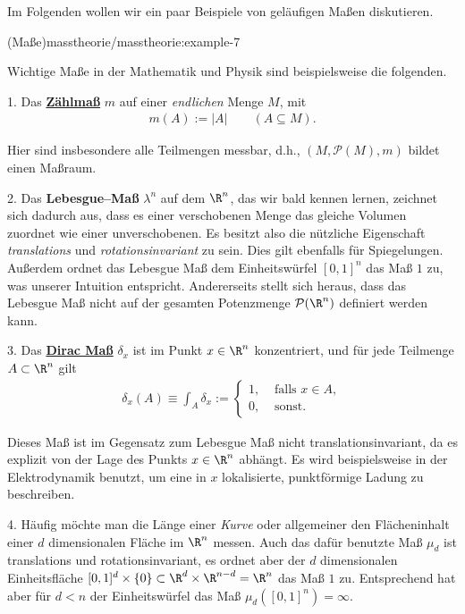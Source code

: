 \documentclass[letterpaper,10pt,german]{jupyterBook}
\begin{document}
\par
Im Folgenden wollen wir ein paar Beispiele von geläufigen Maßen diskutieren.
\begin{example}{(Maße)}{masstheorie/masstheorie:example-7}



\par
Wichtige Maße in der Mathematik und Physik sind beispielsweise die folgenden.

\par
1. Das \href{https://de.wikipedia.org/wiki/Z\%c3\%a4hlma\%c3\%9f\_(Ma\%c3\%9ftheorie)}{\textbf{Zählmaß}} \(m\) auf einer \emph{endlichen} Menge \(M\), mit
\begin{align*}
m(A):=|A|\qquad (A\subseteq M).
\end{align*}
\par
Hier sind insbesondere alle Teilmengen messbar, d.h., \((M, \mathcal{P}(M), m)\) bildet einen Maßraum.

\par
2. Das \textbf{Lebesgue–Maß} \(\lambda^n\) auf dem \(\R^n\), das wir bald kennen lernen, zeichnet sich dadurch aus, dass es einer verschobenen Menge das gleiche Volumen zuordnet wie einer unverschobenen.
Es besitzt also die nützliche Eigenschaft \emph{translations } und \emph{rotationsinvariant} zu sein.
Dies gilt ebenfalls für Spiegelungen.
Außerdem ordnet das Lebesgue Maß dem Einheitswürfel \([0,1]^n\) das Maß \(1\) zu, was unserer Intuition entspricht.
Andererseits stellt sich heraus, dass das Lebesgue Maß nicht auf der gesamten Potenzmenge \(\mathcal{P}(\R^n)\) definiert werden kann.

\par
3. Das \href{https://de.wikipedia.org/wiki/Diracma\%c3\%9f}{\textbf{Dirac Maß}} \(\delta_x\) ist im Punkt \(x \in \R^n\) konzentriert, und für jede Teilmenge \(A\subset\R^n\) gilt
\begin{align*}
\delta_x(A) \equiv \int_A\delta_x := \begin{cases} 1, &  \text{ falls } x \in A,\\ 0, & \text{ sonst}. \end{cases}
\end{align*}
\par
Dieses Maß ist im Gegensatz zum Lebesgue Maß nicht translationsinvariant, da es explizit von der Lage des Punkts \(x\in\R^n\) abhängt.
Es wird beispielsweise in der Elektrodynamik benutzt, um eine in \(x\) lokalisierte, punktförmige Ladung zu beschreiben.

\par
4. Häufig möchte man die Länge einer \emph{Kurve} oder allgemeiner den Flächeninhalt einer \(d\) dimensionalen Fläche im \(\R^n\) messen.
Auch das dafür benutzte Maß \(\mu_d\) ist translations  und rotationsinvariant, es ordnet aber der \(d\) dimensionalen Einheitsfläche \([0,1]^d\times\{0\} \subset\R^d\times\R^{n-d}=\R^n\) das Maß \(1\) zu.
Entsprechend hat aber für \(d<n\) der Einheitswürfel das Maß \(\mu_d([0,1]^n)=\infty\).


\end{example}
\end{document}
